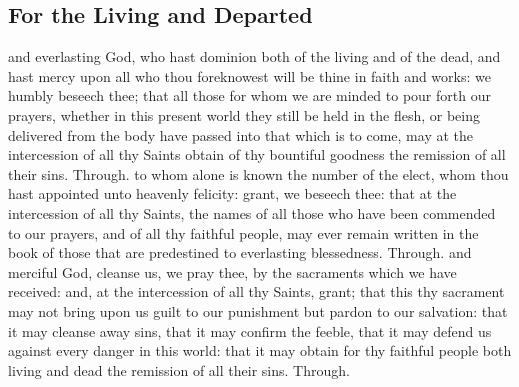 \begin{multicols}{2}
    \subsection{For the Living and Departed}\label{SPLivingDeparted}
   \collect
    and everlasting God, who hast dominion both of the living and of the dead, and hast mercy upon all who thou foreknowest will be thine in faith and works: we humbly beseech thee; that all those for whom we are minded to pour forth our prayers, whether in this present world they still be held in the flesh, or being delivered from the body have passed into that which is to come, may at the intercession of all thy Saints obtain of thy bountiful goodness the remission of all their sins. Through.
   \secret
    to whom alone is known the number of the elect, whom thou hast appointed unto heavenly felicity: grant, we beseech thee: that at the intercession of all thy Saints, the names of all those who have been commended to our prayers, and of all thy faithful people, may ever remain written in the book of those that are predestined to everlasting blessedness. Through.
   \postcommunion
    and merciful God, cleanse us, we pray thee, by the sacraments which we have received: and, at the intercession of all thy Saints, grant; that this thy sacrament may not bring upon us guilt to our punishment but pardon to our salvation: that it may cleanse away sins, that it may confirm the feeble, that it may defend us against every danger in this world: that it may obtain for thy faithful people both living and dead the remission of all their sins. Through.
 \end{multicols}

